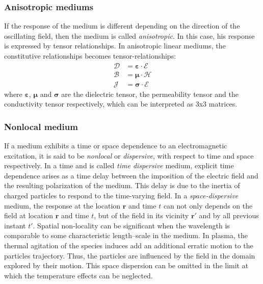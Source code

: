 \subsubsection{Anisotropic mediums}
If the response of the medium is different depending on the direction of the oscillating field, then the medium is called \emph{anisotropic}. In this case, his response is expressed by tensor relationships.   In anisotropic linear mediums, the constitutive relationships becomes tensor-relationships:
\begin{subequations}
 \begin{align}
  \boldsymbol{\mathcal{D}} &= \boldsymbol{\varepsilon} \cdot \boldsymbol{\mathcal{E}}
  \label{eq:disp_relation_anisotropic_stationnary_D} \\
  \boldsymbol{\mathcal{B}} &= \boldsymbol{\mu} \cdot  \boldsymbol{\mathcal{H}} 
  \label{eq:disp_relation_anisotropic_stationnary_B}\\
  \boldsymbol{\mathcal{J}} &= \boldsymbol{\sigma} \cdot  \boldsymbol{\mathcal{E}}
  \label{eq:disp_relation_anisotropic_stationnary_J}
 \end{align}
\end{subequations}
where $\boldsymbol{\varepsilon}$, $\boldsymbol{\mu}$ and $\boldsymbol{\sigma}$ are the dielectric tensor, the permeability tensor and the conductivity tensor respectively, which can be interpreted as 3x3 matrices\parencite{Swanson2003}.  

\subsubsection{Nonlocal medium}
If a medium exhibits a time or space dependence to an electromagnetic excitation, it is said to be \emph{nonlocal} or \emph{dispersive}, with respect to time and space respectively. In a time and is called \emph{time dispersive} medium, explicit time dependence arises as a time delay between the imposition of the electric field and the resulting polarization of the medium. This delay is due to the inertia of charged particles to respond to the time-varying field\parencite{Mackay2010, Brambilla1998}. In a \emph{space-dispersive} medium, the response at the location $\mathbf{r}$ and time $t$ can not only depends on the field at location $\mathbf{r}$ and time $t$, but of the field in its vicinity $\mathbf{r}'$ and by all previous instant $t'$. Spatial non-locality can be significant when the wavelength is comparable to some characteristic length–scale in the medium.  In plasma, the thermal agitation of the species induces add an additional erratic motion to the particles trajectory. Thus, the particles are influenced by the field in the domain explored by their motion\parencite{Brambilla1998}. This space dispersion can be omitted in the limit at which the temperature effects can be neglected. 

